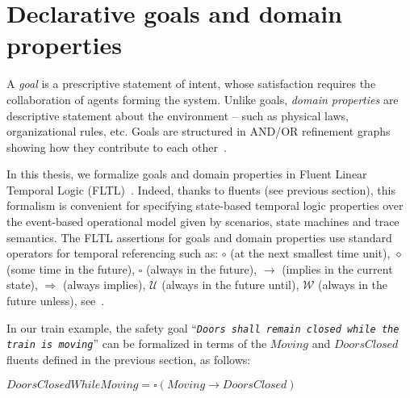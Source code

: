 \section{Declarative goals and domain properties\label{section:background-goals}}

A \emph{goal} is a prescriptive statement of intent, whose satisfaction requires the collaboration of agents forming the system. Unlike goals, \emph{domain properties} are descriptive statement about the environment -- such as physical laws, organizational rules, etc. Goals are structured in AND/OR refinement graphs showing how they contribute to each other~\cite{VanLamsweerde:2000}.

In this thesis, we formalize goals and domain properties in Fluent Linear Temporal Logic (FLTL)~\cite{Giannakopoulou:2003}. Indeed, thanks to fluents (see previous section), this formalism is convenient for specifying state-based temporal logic properties over the event-based operational model given by scenarios, state machines and trace semantics. The FLTL assertions for goals and domain properties use standard operators for temporal referencing such as: $\circ$ (at the next smallest time unit), $\diamond$ (some time in the future), $\square$ (always in the future), $\rightarrow$ (implies in the current state), $\Rightarrow$ (always implies), $\mathcal{U}$ (always in the future until), $\mathcal{W}$ (always in the future unless), see~\cite{Manna:1992}.

In our train example, the safety goal ``\emph{\texttt{Doors shall remain closed while the train is moving}}'' can be formalized in terms of the $Moving$ and $DoorsClosed$ fluents defined in the previous section, as follows:

\begin{center}
$DoorsClosedWhileMoving = \square(Moving \rightarrow DoorsClosed)$
\end{center}


